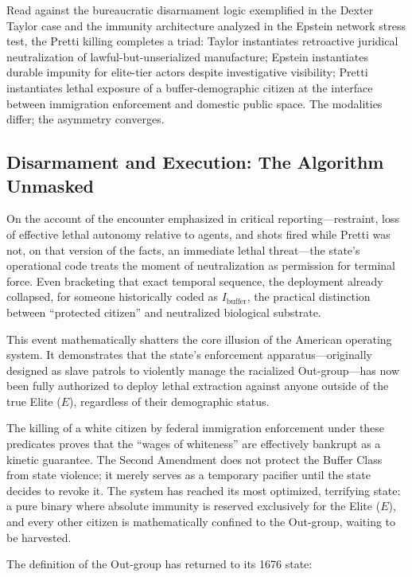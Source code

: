 \documentclass[12pt,openany]{book}
\begin{document}
Read against the bureaucratic disarmament logic exemplified in the Dexter Taylor case and the immunity architecture analyzed in the Epstein network stress test, the Pretti killing completes a triad: Taylor instantiates retroactive juridical neutralization of lawful-but-unserialized manufacture; Epstein instantiates durable impunity for elite-tier actors despite investigative visibility; Pretti instantiates lethal exposure of a buffer-demographic citizen at the interface between immigration enforcement and domestic public space. The modalities differ; the asymmetry converges.

\subsection{Disarmament and Execution: The Algorithm Unmasked}

On the account of the encounter emphasized in critical reporting---restraint, loss of effective lethal autonomy relative to agents, and shots fired while Pretti was not, on that version of the facts, an immediate lethal threat---the state's operational code treats the moment of neutralization as permission for terminal force. Even bracketing that exact temporal sequence, the deployment already collapsed, for someone historically coded as $I_{\text{buffer}}$, the practical distinction between ``protected citizen'' and neutralized biological substrate.

This event mathematically shatters the core illusion of the American operating system. It demonstrates that the state's enforcement apparatus---originally designed as slave patrols to violently manage the racialized Out-group---has now been fully authorized to deploy lethal extraction against anyone outside of the true Elite ($E$), regardless of their demographic status.

The killing of a white citizen by federal immigration enforcement under these predicates proves that the ``wages of whiteness'' are effectively bankrupt as a kinetic guarantee. The Second Amendment does not protect the Buffer Class from state violence; it merely serves as a temporary pacifier until the state decides to revoke it. The system has reached its most optimized, terrifying state: a pure binary where absolute immunity is reserved exclusively for the Elite ($E$), and every other citizen is mathematically confined to the Out-group, waiting to be harvested.

The definition of the Out-group has returned to its 1676 state:
\end{document}

